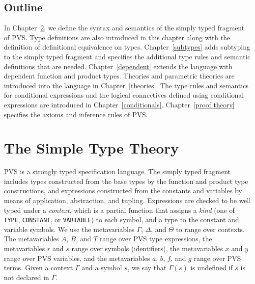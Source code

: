 \documentclass [12pt,twoside]{cslreport}
\begin{document}
\section{Outline}

In Chapter~\ref{simple}, we define the syntax and semantics of the simply
typed fragment of PVS.  Type definitions are also introduced in this
chapter along with the definition of definitional equivalence on types.
Chapter~\ref{subtypes} adds subtyping to the simply typed fragment and
specifies the additional type rules and semantic definitions that are
needed.  Chapter~\ref{dependent} extends the language with dependent
function and product types.  Theories and parametric theories are introduced
into the language in Chapter~\ref{theories}.  The type rules and semantics
for conditional expressions and the logical connectives defined using
conditional expressions are introduced in Chapter~\ref{conditionals}.
Chapter~\ref{proof theory} specifies the axioms and inference rules of
PVS\@.
 
\chapter{The Simple Type Theory}\label{simple}

\begin{comment}
The types of expression
are determined from the types of their subexpressions.  In the base case,
the types of atomic expressions must be given in a context.  There are
certain well-formedness constraints on contexts that we now specify.
A context is a sequence of declarations.  Declarations can either
be type declarations of the form $T\ :\ \mathtt{TYPE}$ where $T$ is a symbol,
constant declarations of the form $c\ :\ T$, or variable declarations of
the form $x\ :\ \mathtt{VAR} T$.  
The empty context $\{\}$ is a context.  If $\Gamma$ is a context,
then
\end{comment}

PVS is a strongly typed specification language.  The simply typed fragment
includes types constructed from the base types by the function and product
type constructions, and expressions constructed from the constants and
variables by means of application, abstraction, and tupling.  Expressions
are checked to be well typed under a {\em context\/}, which is a partial
function that assigns a {\em kind\/} (one of \texttt{TYPE},
\texttt{CONSTANT}, or \texttt{VARIABLE}) to each symbol, and a type to the
constant and variable symbols.  We use the metavariables $\Gamma$,
$\Delta$, and $\Theta$ to range over contexts.  The metavariables $A$,
$B$, and $T$ range over PVS type expressions, the metavariables $r$ and
$s$ range 
over symbols (identifiers), the metavariables $x$ and $y$ range over PVS
variables, and the metavariables $a$, $b$, $f$, and $g$ range over PVS
terms.  Given 
a context $\Gamma$ and a symbol $s$, we say that $\Gamma(s)$ is
undefined if $s$ is not declared in $\Gamma$\@.
\end{document}
